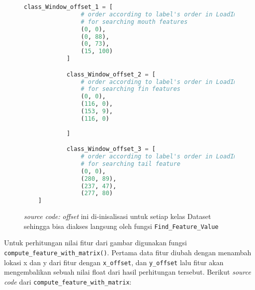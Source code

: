 	\begin{figure}[H]
		\begin{lstlisting}[language=Python, basicstyle=\tiny]
			class_Window_offset_1 = [
				# order according to label's order in LoadImages
				# for searching mouth features
				(0, 0),
				(0, 88),
				(0, 73),
				(15, 100)
			]

			class_Window_offset_2 = [
				# order according to label's order in LoadImages
				# for searching fin features
				(0, 0),
				(116, 0),
				(153, 9),
				(116, 0)
    
			]

			class_Window_offset_3 = [
				# order according to label's order in LoadImages
				# for searching tail feature
				(0, 0),
				(280, 89),
				(237, 47),
				(277, 80)
    ]
		\end{lstlisting}
		\caption{\emph{source code:} \textit{offset} ini di-inisalisasi untuk setiap kelas Dataset 
		sehingga bisa diakses langsung oleh fungsi \texttt{Find\_Feature\_Value}}
		\label{code:Training sub-window offset}
	\end{figure}

	Untuk perhitungan nilai fitur dari gambar digunakan fungsi \texttt{compute\_feature\_with\_matrix()}. 
	Pertama data fitur diubah dengan menambah lokasi x dan y dari fitur dengan \texttt{x\_offset}, dan  \texttt{y\_offset} 
	lalu fitur akan mengembalikan sebuah nilai float dari hasil perhitungan tersebut. Berikut \emph{source code} 
	dari \texttt{compute\_feature\_with\_matrix}:
	

